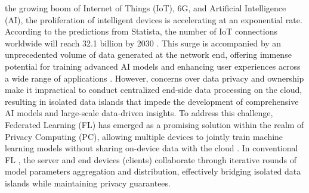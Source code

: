 \documentclass[10pt,journal]{IEEEtran}
\begin{document}
\maketitle


\IEEEdisplaynontitleabstractindextext

%

\IEEEpeerreviewmaketitle
\vspace{20pt}
 the growing boom of Internet of Things (IoT), 6G, and Artificial Intelligence (AI), the proliferation of intelligent devices is accelerating at an exponential rate. According to the predictions from Statista, the number of IoT connections worldwide will reach 32.1 billion by 2030 \cite{iot-predict}. 
This surge is accompanied by an unprecedented volume of data generated at the network end, offering immense potential for training advanced AI models and enhancing user experiences across a wide range of applications \cite{baccour2022pervasive}. However, concerns over data privacy and ownership make it impractical to conduct centralized end-side data processing on the cloud, resulting in isolated data islands \cite{yang2019federated} that impede the development of comprehensive AI models and large-scale data-driven insights. To address this challenge, Federated Learning (FL) has emerged as a promising solution within the realm of Privacy Computing (PC), allowing multiple devices to jointly train machine learning models without sharing on-device data with the cloud \cite{nguyen2021federated}. In conventional FL \cite{mcmahan2017communication,li2020federated,karimireddy2020scaffold}, the server and end devices (clients) collaborate through iterative rounds of model parameters aggregation and distribution, effectively bridging isolated data islands while maintaining privacy guarantees.
\end{document}
